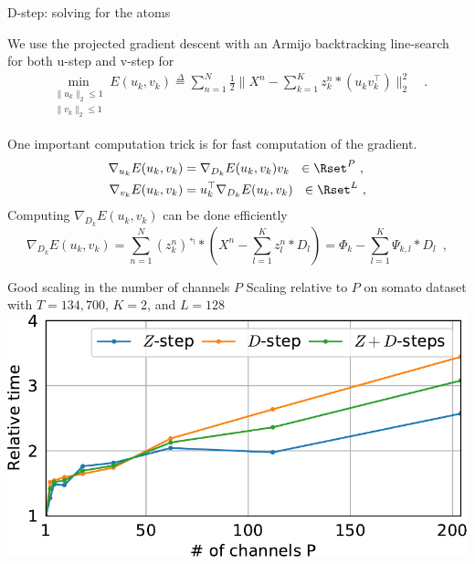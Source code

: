 \documentclass{beamer}
\begin{document}
\begin{frame}{D-step: solving for the atoms}

	We use the projected gradient descent with an Armijo backtracking line-search \cite{Wright1999} for both u-step and v-step for
	\begin{equation}
		\begin{split}
			\min_{\substack{\|u_{k}\|_2 \leq 1\\\|v_{k}\|_2 \leq 1}} E(u_k, v_k) \overset{\Delta}{=} \sum_{n=1}^N\frac{1}{2}\|X^n - \sum_{k=1}^K z^n_k * (u_k^{ }  v_k^\top) \|_{2}^{2} \hspace{6pt}
			\enspace .
		\end{split}
	\end{equation}

	One important computation trick is for fast computation of the gradient.
	\[
	\begin{split}
		\nabla_{u_k} E(u_k, v_k) &=  \nabla_{D_k}E(u_k, v_k) v_k ~~ \in \Rset^{P}~,\\
		\nabla_{v_k} E(u_k, v_k) &=  u_k^\top \nabla_{D_k} E(u_k, v_k)  ~~ \in \Rset^L~,
	\end{split}
	\]
	Computing $\nabla_{D_k} E(u_k, v_k)$ can be done efficiently
	\[
	\nabla_{D_{k}} E(u_k, v_k) =  \sum_{n=1}^N (z_k^n)^\Lsh * \left(X^n - \sum_{l=1}^K z^n_l * D_l\right)
	=  \Phi_k - \sum_{l=1}^K \Psi_{k, l} *  D_l \enspace ,
	\]

\end{frame}


\begin{frame}{Good scaling in the number of channels $P$}
    Scaling relative to $P$ on somato dataset with $T=134,700$, $K=2$, and $L=128$\\[1em]
    \includegraphics[width=\textwidth]{scaling_channels_reg0_001_mean_rank1_K2_L128.pdf}
\end{frame}
\end{document}

